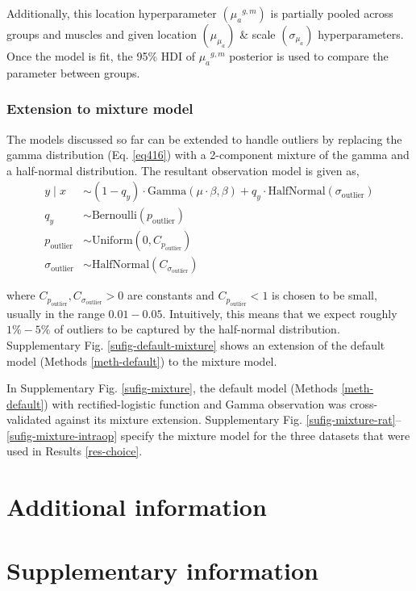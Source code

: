 \documentclass[pdflatex,sn-mathphys-ay]{sn-jnl}%
\numberwithin{equation}{subsection}
\theoremstyle{thmstyleone}%
\theoremstyle{thmstyletwo}%
\theoremstyle{thmstylethree}%
\begin{document}
Additionally, this location hyperparameter $\left({\mu_a}^{g,m}\right)$ is partially pooled across groups and muscles and given location $\left(\mu_{\mu_a}\right)$ \& scale $\left(\sigma_{\mu_a}\right)$ hyperparameters. Once the model is fit, the 95\% HDI of ${\mu_{a}}^{g,m}$ posterior is used to compare the parameter between groups.

\subsubsection{Extension to mixture model}

The models discussed so far can be extended to handle outliers by replacing the gamma distribution (Eq. \ref{eq416}) with a 2-component mixture of the gamma and a half-normal distribution. The resultant observation model is given as,
\begin{align}
    y \mid x &\sim \left(1 - q_y\right)\cdot\text{Gamma}\left(\mu\cdot\beta, \beta\right) + q_y \cdot \text{HalfNormal}\left(\sigma_{\text{outlier}}\right) \label{eq425} \\
    q_y &\sim \text{Bernoulli}\left(p_{\text{outlier}}\right) \label{eq426} \\
    p_{\text{outlier}} &\sim \text{Uniform}\left(0, C_{p_{\text{outlier}}}\right) \label{eq427} \\
    \sigma_{\text{outlier}} &\sim \text{HalfNormal}\left(C_{\sigma_{\text{outlier}}}\right)\label{eq428}
\end{align}

where $C_{p_{\text{outlier}}}, C_{\sigma_{\text{outlier}}} > 0$ are constants and $C_{p_{\text{outlier}}} < 1$ is chosen to be small, usually in the range $0.01 - 0.05$. Intuitively, this means that we expect roughly $1\% - 5\%$ of outliers to be captured by the half-normal distribution. Supplementary Fig. \ref{sufig-default-mixture} shows an extension of the default model (Methods \ref{meth-default}) to the mixture model.

\bigskip\noindent In Supplementary Fig. \ref{sufig-mixture}, the default model (Methods \ref{meth-default}) with rectified-logistic function and Gamma observation was cross-validated against its mixture extension. Supplementary Fig. \ref{sufig-mixture-rat}--\ref{sufig-mixture-intraop} specify the mixture model for the three datasets that were used in Results \ref{res-choice}.


\section{Additional information}

\section{Supplementary information}
\end{document}
